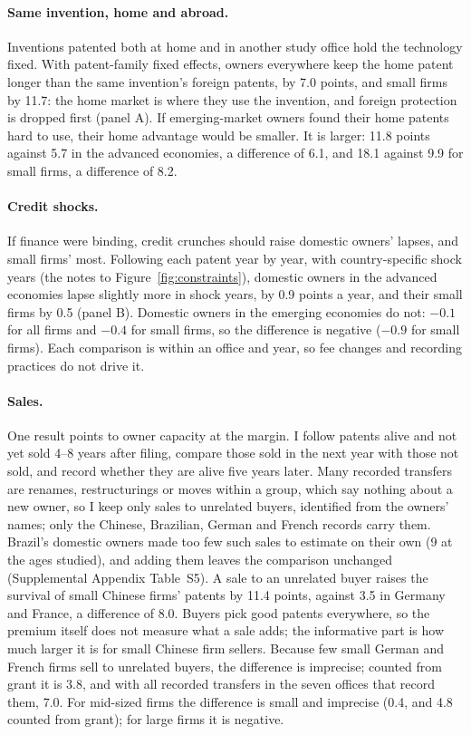 \paragraph{Same invention, home and abroad.} Inventions patented both at home and in another study office hold the
technology fixed. With patent-family fixed effects, owners everywhere keep the home patent longer than the same
invention's foreign patents, by 7.0 points, and small firms by 11.7: the home market is where they use the invention,
and foreign protection is dropped first (panel A). If emerging-market owners found their home patents hard to use,
their home advantage would be smaller. It is larger: 11.8 points against 5.7 in the advanced economies, a difference
of 6.1, and 18.1 against 9.9 for small firms, a difference of 8.2.

\paragraph{Credit shocks.} If finance were binding, credit crunches should raise domestic owners' lapses, and small
firms' most. Following each patent year by year, with country-specific shock years (the notes to Figure~\ref{fig:constraints}), domestic
owners in the advanced economies lapse slightly more in shock years, by 0.9 points a year, and their small firms by 0.5
(panel B). Domestic owners in the emerging economies do not: $-0.1$ for all firms and $-0.4$ for small firms, so the
difference is negative ($-0.9$ for small firms). Each comparison is within an office and year, so fee changes and
recording practices do not drive it.

\paragraph{Sales.} One result points to owner capacity at the margin. I follow patents alive and not yet sold 4--8
years after filing, compare those sold in the next year with those not sold, and record whether they are alive five
years later. Many recorded transfers are renames, restructurings or moves within a group, which say nothing about a
new owner, so I keep only sales to unrelated buyers, identified from the owners' names; only the Chinese, Brazilian, German and French records carry them. Brazil's
domestic owners made too few such sales to estimate on their own (9 at the ages studied), and adding them leaves the
comparison unchanged (Supplemental Appendix Table~S5). A sale to an unrelated buyer raises the survival of small
Chinese firms' patents by 11.4 points, against 3.5 in Germany and France, a difference of 8.0.
Buyers pick good patents everywhere, so the premium itself does not measure what a sale adds; the informative part is
how much larger it is for small Chinese firm sellers. Because few small German and French firms sell to unrelated
buyers, the difference is imprecise; counted from grant it is 3.8, and with all recorded transfers in the seven
offices that record them, 7.0. For mid-sized firms the difference is small and imprecise (0.4, and 4.8 counted from grant); for large firms it is negative.

